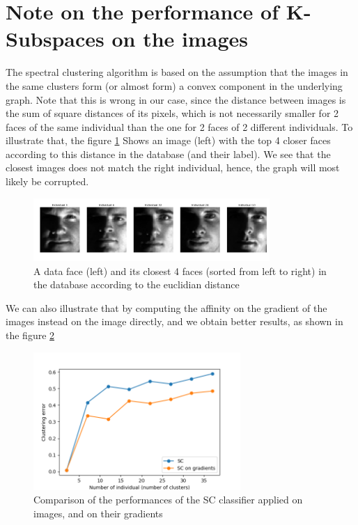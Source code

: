 \documentclass[a4paper, 11pt]{article}
\begin{document}
\newpage
\appendix

\section{Note on the performance of K-Subspaces on the images}

The spectral clustering algorithm is based on the assumption that the
images in the same clusters form (or almost form) a convex component
in the underlying graph. Note that this is wrong in our case, since
the distance between images is the sum of square distances of its
pixels, which is not necessarily smaller for 2 faces of the same
individual than the one for 2 faces of 2 different individuals.  To
illustrate that, the figure \ref{fig:individual-distances} Shows an
image (left) with the top 4 closer faces according to this distance in
the database (and their label). We see that the closest images does
not match the right individual, hence, the graph will most likely be
corrupted.

\begin{figure}[h]
  \centering
  \includegraphics[width=0.8\textwidth]{individual_distances}
  \caption{A data face (left) and its closest 4 faces (sorted from
    left to right) in the database according to the euclidian
    distance}\label{fig:individual-distances}
\end{figure}

We can also illustrate that by computing the affinity on the gradient
of the images instead on the image directly, and we obtain better
results, as shown in the figure \ref{fig:sc-gradient}

\begin{figure}[h]
  \centering
  \includegraphics[width=0.7\textwidth]{sc_gradient}
  \caption{Comparison of the performances of the SC classifier applied
    on images, and on their gradients}\label{fig:sc-gradient}
\end{figure}
\end{document}
